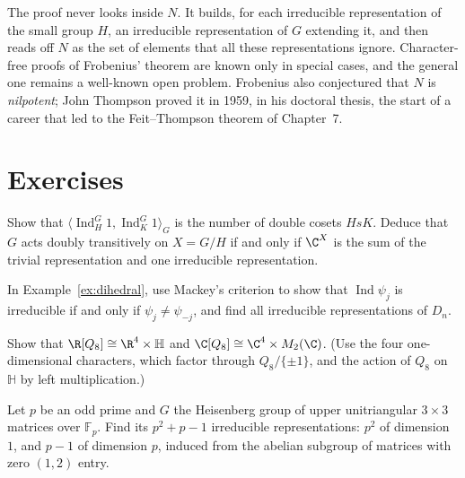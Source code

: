 \begin{beauty}
The proof never looks inside $N$. It builds, for each irreducible representation of the small group $H$, an irreducible representation of $G$ extending it, and then reads off $N$ as the set of elements that all these
representations ignore. Character-free proofs of Frobenius' theorem are known only in special cases, and the general one remains a well-known open problem. Frobenius also conjectured that $N$ is \emph{nilpotent}; John Thompson
proved it in 1959, in his doctoral thesis, the start of a career that led to the Feit--Thompson theorem of Chapter~7.
\end{beauty}

\section{Exercises}

\begin{exercise}[$\star$]\label{ex:doublecosets}
Show that $\langle\operatorname{Ind}_H^G1,\operatorname{Ind}_K^G1\rangle_G$ is the number of double cosets $HsK$. Deduce that $G$ acts doubly transitively on $X=G/H$ if and only if $\C^X$ is the sum of the trivial representation and one
irreducible representation.
\end{exercise}

\begin{exercise}[$\star$]\label{ex:dihedralmackey}
In Example~\ref{ex:dihedral}, use Mackey's criterion to show that $\operatorname{Ind}\psi_j$ is irreducible if and only if $\psi_j\ne\psi_{-j}$, and find all irreducible representations of $D_n$.
\end{exercise}

\begin{exercise}[$\star\star$]\label{ex:rq8}
Show that $\R[Q_8]\cong\R^4\times\mathbb H$ and $\C[Q_8]\cong\C^4\times M_2(\C)$. (Use the four one-dimensional characters, which factor through $Q_8/\{\pm1\}$, and the action of $Q_8$ on $\mathbb H$ by left multiplication.)
\end{exercise}

\begin{exercise}[$\star\star$]\label{ex:heisenberg}
Let $p$ be an odd prime and $G$ the Heisenberg group of upper unitriangular $3\times3$ matrices over $\mathbb F_p$. Find its $p^2+p-1$ irreducible representations: $p^2$ of dimension $1$, and $p-1$ of dimension $p$, induced from the
abelian subgroup of matrices with zero $(1,2)$ entry.
\end{exercise}

